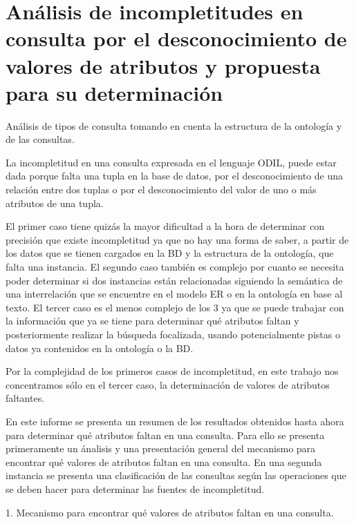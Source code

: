 \chapter{Análisis de incompletitudes en consulta por el desconocimiento de valores de atributos y propuesta para su determinación} \label{chap:analisisFuenteIncompletitud}

Análisis de tipos de consulta tomando en cuenta la estructura de la ontología y de las consultas.


	La incompletitud en una consulta expresada en el lenguaje ODIL, puede estar dada porque falta una tupla en la base de datos,  por el desconocimiento de una relación entre dos tuplas o por el desconocimiento del valor de uno o más atributos de una tupla.

El primer caso tiene quizás la mayor dificultad a la hora de determinar con precisión que existe incompletitud ya que no hay una forma de saber, a partir de los datos que se tienen cargados en la BD y la estructura de la ontología, que falta una instancia. El segundo caso también es complejo por cuanto se necesita poder determinar si dos instancias están relacionadas siguiendo la semántica de una interrelación que se encuentre en el modelo ER o en la ontología en base al texto. El tercer caso es el menos complejo de los 3 ya que se puede trabajar con la información que ya se tiene para determinar qué atributos faltan y posteriormente realizar la búsqueda focalizada, usando potencialmente pistas o datos ya contenidos en la ontología o la BD.

Por la complejidad de los primeros casos de incompletitud, en este trabajo nos concentramos sólo en el tercer caso, la determinación de valores de atributos faltantes.

En este informe se presenta un resumen de los resultados obtenidos hasta ahora  para determinar qué atributos faltan en una consulta. Para ello se presenta primeramente un ánalisis y una presentación general del mecanismo para encontrar qué valores de atributos faltan en una consulta. En una segunda instancia se presenta una clasificación de las consultas según las operaciones que se deben hacer para determinar las fuentes de incompletitud.

1. Mecanismo para encontrar qué valores de atributos faltan en una consulta.

